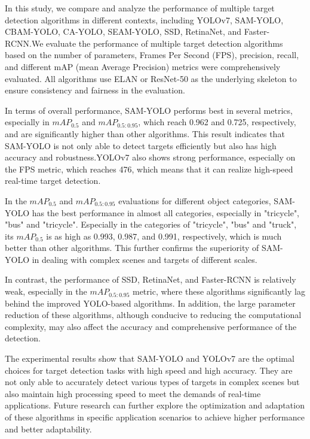 \documentclass[aic]{iosart2x}
\begin{document}
In this study, we compare and analyze the performance of multiple target detection algorithms in different contexts, including YOLOv7, SAM-YOLO, CBAM-YOLO, CA-YOLO, SEAM-YOLO, SSD, RetinaNet, and Faster-RCNN.We evaluate the performance of multiple target detection algorithms based on the number of parameters, Frames Per Second (FPS), precision, recall, and different mAP (mean Average Precision) metrics were comprehensively evaluated. All algorithms use ELAN or ResNet-50 as the underlying skeleton to ensure consistency and fairness in the evaluation.

In terms of overall performance, SAM-YOLO performs best in several metrics, especially in $mAP_{0.5}$ and $mAP_{0.5:0.95}$, which reach 0.962 and 0.725, respectively, and are significantly higher than other algorithms. This result indicates that SAM-YOLO is not only able to detect targets efficiently but also has high accuracy and robustness.YOLOv7 also shows strong performance, especially on the FPS metric, which reaches 476, which means that it can realize high-speed real-time target detection.

In the $mAP_{0.5}$ and $mAP_{0.5:0.95}$ evaluations for different object categories, SAM-YOLO has the best performance in almost all categories, especially in "tricycle", "bus" and "tricycle". Especially in the categories of "tricycle", "bus" and "truck", its $mAP_{0.5}$ is as high as 0.993, 0.987, and 0.991, respectively, which is much better than other algorithms. This further confirms the superiority of SAM-YOLO in dealing with complex scenes and targets of different scales.

In contrast, the performance of SSD, RetinaNet, and Faster-RCNN is relatively weak, especially in the $mAP_{0.5:0.95}$ metric, where these algorithms significantly lag behind the improved YOLO-based algorithms. In addition, the large parameter reduction of these algorithms, although conducive to reducing the computational complexity, may also affect the accuracy and comprehensive performance of the detection.

The experimental results show that SAM-YOLO and YOLOv7 are the optimal choices for target detection tasks with high speed and high accuracy. They are not only able to accurately detect various types of targets in complex scenes but also maintain high processing speed to meet the demands of real-time applications. Future research can further explore the optimization and adaptation of these algorithms in specific application scenarios to achieve higher performance and better adaptability.
\end{document}
